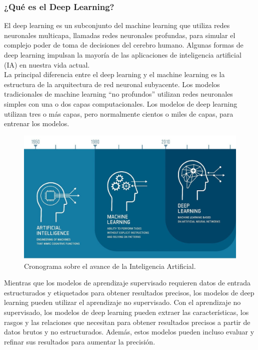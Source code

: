 \documentclass{article}
\begin{document}
\subsubsection{¿Qué es el Deep Learning?}
El deep learning es un subconjunto del machine learning \cite{ibm-ml} que utiliza redes neuronales \cite{ibm-nn} multicapa, llamadas redes neuronales profundas, para simular el complejo poder de toma de decisiones del cerebro humano. Algunas formas de deep learning impulsan la mayoría de las aplicaciones de inteligencia artificial \cite{ibm-ia} (IA) en nuestra vida actual. \\

La principal diferencia entre el deep learning y el machine learning es la estructura de la arquitectura de red neuronal subyacente. Los modelos tradicionales de machine learning \cite{ibm-ml-types} ``no profundos'' utilizan redes neuronales simples con una o dos capas computacionales. Los modelos de deep learning utilizan tres o más capas, pero normalmente cientos o miles de capas, para entrenar los modelos. \\

\begin{figure}[H]
    \centering
    \includegraphics[scale=0.2]{history.png}
    \caption{Cronograma sobre el avance de la Inteligencia Artificial. \cite{tjk2024deep}}
\end{figure}

Mientras que los modelos de aprendizaje supervisado requieren datos de entrada estructurados y etiquetados para obtener resultados precisos, los modelos de deep learning pueden utilizar el aprendizaje no supervisado. Con el aprendizaje no supervisado, los modelos de deep learning pueden extraer las características, los rasgos y las relaciones que necesitan para obtener resultados precisos a partir de datos brutos y no estructurados. Además, estos modelos pueden incluso evaluar y refinar sus resultados para aumentar la precisión. \\
\end{document}
